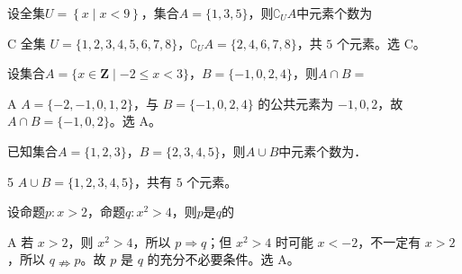 


\begin{question}
设全集$U=\left\{ x\mid x<9 \right\}$，集合$A=\{1,3,5\}$，则$\complement_U A$中元素个数为\choiceBox
{}
\end{question}
\begin{answer}{C}
全集 $U=\{1,2,3,4,5,6,7,8\}$，$\complement_UA=\{2,4,6,7,8\}$，共 $5$ 个元素。选 C。
\end{answer}

\begin{question}[GPT生成]
设集合$A=\{x\in\mathbf{Z}\mid -2\le x<3\}$，$B=\{-1,0,2,4\}$，则$A\cap B=$\choiceBox
{}
\end{question}
\begin{answer}{A}
$A=\{-2,-1,0,1,2\}$，与 $B=\{-1,0,2,4\}$ 的公共元素为 $-1,0,2$，故 $A\cap B=\{-1,0,2\}$。选 A。
\end{answer}

\begin{question}[GPT生成]
已知集合$A=\{1,2,3\}$，$B=\{2,3,4,5\}$，则$A\cup B$中元素个数为\blank{3cm}．
\end{question}
\begin{answer}{5}
$A\cup B=\{1,2,3,4,5\}$，共有 $5$ 个元素。
\end{answer}



\begin{question}[GPT生成]
设命题$p:x>2$，命题$q:x^2>4$，则$p$是$q$的\choiceBox
{}
\end{question}
\begin{answer}{A}
若 $x>2$，则 $x^2>4$，所以 $p\Rightarrow q$；但 $x^2>4$ 时可能 $x<-2$，不一定有 $x>2$，所以 $q\nRightarrow p$。故 $p$ 是 $q$ 的充分不必要条件。选 A。
\end{answer}

